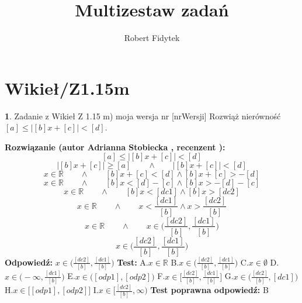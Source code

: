 \documentclass[12pt, a4paper]{article}
\title{Multizestaw zadań}
\author{Robert Fidytek}
\date{}
\theoremstyle{definition} %
\newtheorem{zad}{}
\newcommand{\kategoria}[1]{\section{#1}} %
\newcommand{\zadStart}[1]{\begin{zad}#1\newline} %
\newcommand{\zadStop}{\end{zad}}   %
\newcommand{\rozwStart}[2]{\noindent \textbf{Rozwiązanie (autor #1 , recenzent #2): }\newline} %
\newcommand{\rozwStop}{\newline}                                            %
\newcommand{\odpStart}{\noindent \textbf{Odpowiedź:}\newline}    %
\newcommand{\odpStop}{\newline}                                             %
\newcommand{\testStart}{\noindent \textbf{Test:}\newline} %
\newcommand{\testStop}{\newline} %
\newcommand{\kluczStart}{\noindent \textbf{Test poprawna odpowiedź:}\newline} %
\newcommand{\kluczStop}{\newline} %
\begin{document}
\maketitle


\kategoria{Wikieł/Z1.15m}
\zadStart{Zadanie z Wikieł Z 1.15 m) moja wersja nr [nrWersji]}
Rozwiąż nierówność $[a]\leq|[b]x+[c]|<[d]$.
\zadStop
\rozwStart{Adrianna Stobiecka}{}
$$[a]\leq|[b]x+[c]|<[d]$$
$$|[b]x+[c]|\geq[a]\qquad\land\qquad|[b]x+[c]|<[d]$$
$$x\in\mathbb{R}\qquad\land\qquad[b]x+[c]<[d]\land[b]x+[c]>-[d]$$
$$x\in\mathbb{R}\qquad\land\qquad[b]x<[d]-[c]\land[b]x>-[d]-[c]$$
$$x\in\mathbb{R}\qquad\land\qquad[b]x<[dc1]\land[b]x>[dc2]$$
$$x\in\mathbb{R}\qquad\land\qquad x<\frac{[dc1]}{[b]}\land x>\frac{[dc2]}{[b]}$$
$$x\in\mathbb{R}\qquad\land\qquad x\in\bigg(\frac{[dc2]}{[b]},\frac{[dc1]}{[b]}\bigg)$$
$$x\in\bigg(\frac{[dc2]}{[b]},\frac{[dc1]}{[b]}\bigg)$$
\rozwStop
\odpStart
$x\in\bigg(\frac{[dc2]}{[b]},\frac{[dc1]}{[b]}\bigg)$
\odpStop
\testStart
A.$x\in\mathbb{R}$
B.$x\in\bigg(\frac{[dc2]}{[b]},\frac{[dc1]}{[b]}\bigg)$
C.$x\in\emptyset$
D.$x\in\bigg(-\infty,\frac{[dc1]}{[b]}\bigg)$
E.$x\in\bigg([odp1],[odp2]\bigg)$
F.$x\in\bigg[\frac{[dc2]}{[b]},\frac{[dc1]}{[b]}\bigg]$
G.$x\in\bigg(\frac{[dc2]}{[b]},[dc1]\bigg)$
H.$x\in\bigg[[odp1],[odp2]\bigg]$
I.$x\in\bigg[\frac{[dc2]}{[b]},\infty\bigg)$
\testStop
\kluczStart
B
\kluczStop
\end{document}

